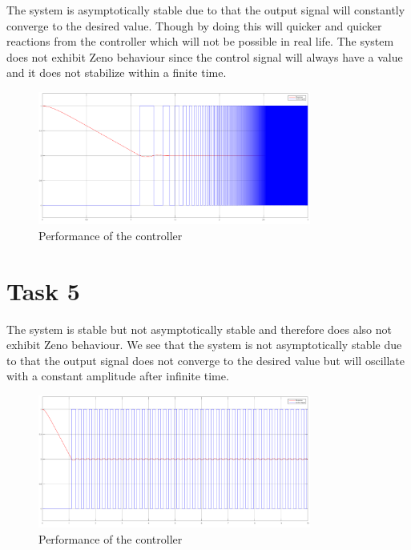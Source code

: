 \documentclass[a4paper,12pt,oneside,onecolumn]{article} %
\begin{document}
The system is asymptotically stable due to that the output signal will constantly converge to the desired value. Though by doing this will quicker and quicker reactions from the controller which will not be possible in real life. The system does not exhibit Zeno behaviour since the control signal will always have a value and it does not stabilize within a finite time. 

\begin{figure}[H]
\begin{center}	
  \includegraphics[width = 0.8\textwidth]{rot2.png}
  \caption{Performance of the controller}
  
 \end{center}
\end{figure}
\section*{Task 5}

The system is stable but not asymptotically stable and therefore does also not exhibit Zeno behaviour. We see that the system is not asymptotically stable due to that the output signal does not converge to the desired value but will oscillate with a constant amplitude after infinite time.

\begin{figure}[H]
\begin{center}	
  \includegraphics[width = 0.8\textwidth]{rot3.png}
  \caption{Performance of the controller}
  
 \end{center}
\end{figure}
\end{document}
